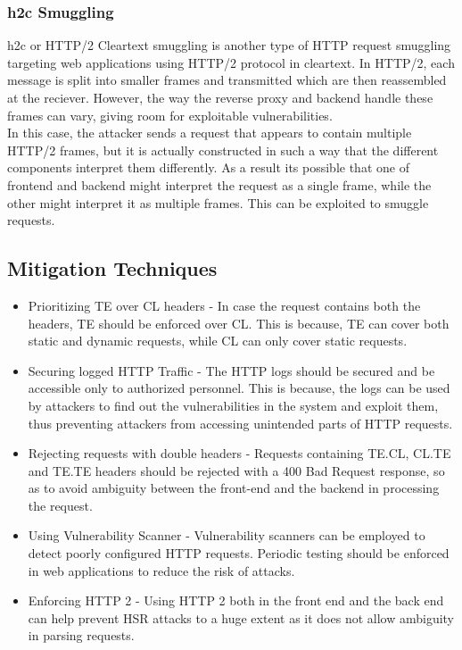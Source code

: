 \documentclass[conference]{IEEEtran}
\begin{document}
\begin{enumerate}
\subsubsection*{h2c Smuggling}
h2c or HTTP/2 Cleartext smuggling is another type of HTTP request smuggling targeting web applications using HTTP/2 protocol in cleartext. In HTTP/2, each message  is split into smaller frames and transmitted which are then reassembled at the reciever. However, the way the reverse proxy and backend handle these frames can vary, giving room for exploitable vulnerabilities. \\
In this case, the attacker sends a request that appears to contain multiple HTTP/2 frames, but it is actually constructed in such a way that the different components interpret them differently. As a result its possible that one of frontend and backend might interpret the request as a single frame, while the other might interpret it as multiple frames. This can be exploited to smuggle requests. \\
\end{enumerate}

\subsection*{Mitigation Techniques}
\begin{itemize}
	\item Prioritizing TE over CL headers - In case the request contains both the headers, TE should be enforced over CL. This is because, TE can cover both static and dynamic requests, while CL can only cover static requests.
	\item Securing logged HTTP Traffic - The HTTP logs should be secured and be accessible only to authorized personnel. This is because, the logs can be used by attackers to find out the vulnerabilities in the system and exploit them, thus preventing attackers from accessing unintended parts of HTTP requests.
	\item Rejecting requests with double headers - Requests containing TE.CL, CL.TE and TE.TE headers should be rejected with a 400 Bad Request response, so as to avoid ambiguity between the front-end and the backend in processing the request.
	\item Using Vulnerability Scanner -  Vulnerability scanners can be employed to detect poorly configured HTTP requests. Periodic testing should be enforced in web applications to reduce the risk of attacks.
	\item Enforcing HTTP 2 - Using HTTP 2 both in the front end and the back end can help prevent HSR attacks to a huge extent as it does not allow ambiguity in parsing requests.
\end{itemize}
\end{document}
